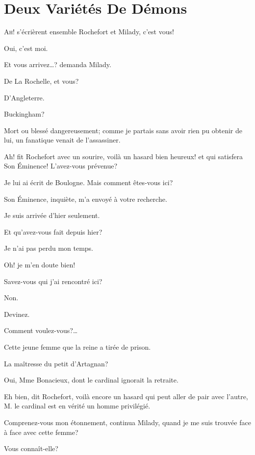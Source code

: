 
\chapter{Deux Variétés De Démons} 
	
\lettrine[ante=«]{A}{h!} s'écrièrent ensemble Rochefort et Milady, c'est vous! 

\zz
\speak  Oui, c'est moi. 

\zz
\speak  Et vous arrivez\dots? demanda Milady. 

\speak  De La Rochelle, et vous? 

\speak  D'Angleterre. 

\speak  Buckingham? 

\speak  Mort ou blessé dangereusement; comme je partais sans avoir rien pu obtenir de lui, un fanatique venait de l'assassiner. 

\speak  Ah! fit Rochefort avec un sourire, voilà un hasard bien heureux! et qui satisfera Son Éminence! L'avez-vous prévenue? 

\speak  Je lui ai écrit de Boulogne. Mais comment êtes-vous ici? 

\speak  Son Éminence, inquiète, m'a envoyé à votre recherche. 

\speak  Je suis arrivée d'hier seulement. 

\speak  Et qu'avez-vous fait depuis hier? 

\speak  Je n'ai pas perdu mon temps. 

\speak  Oh! je m'en doute bien! 

\speak  Savez-vous qui j'ai rencontré ici? 

\speak  Non. 

\speak  Devinez. 

\speak  Comment voulez-vous?\dots 

\speak  Cette jeune femme que la reine a tirée de prison. 

\speak  La maîtresse du petit d'Artagnan? 

\speak  Oui, Mme Bonacieux, dont le cardinal ignorait la retraite. 

\speak  Eh bien, dit Rochefort, voilà encore un hasard qui peut aller de pair avec l'autre, M. le cardinal est en vérité un homme privilégié. 

\speak  Comprenez-vous mon étonnement, continua Milady, quand je me suis trouvée face à face avec cette femme? 

\speak  Vous connaît-elle? 

